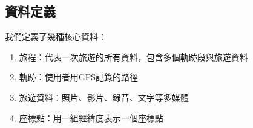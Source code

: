 \subsection{資料定義}

我們定義了幾種核心資料：

\begin{enumerate}
    \item 旅程：代表一次旅遊的所有資料，包含多個軌跡段與旅遊資料
    \item 軌跡：使用者用GPS記錄的路徑
    \item 旅遊資料：照片、影片、錄音、文字等多媒體
    \item 座標點：用一組經緯度表示一個座標點
\end{enumerate}
